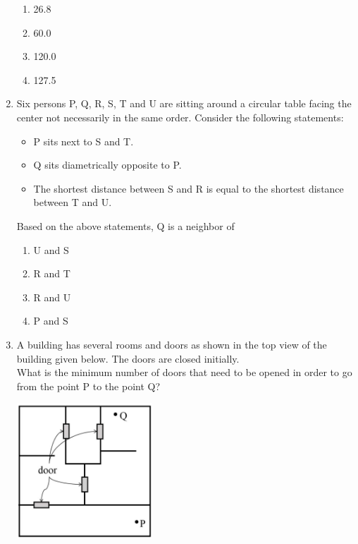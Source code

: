 \documentclass[journal,12pt,onecolumn]{exam}
\theoremstyle{remark}
\begin{document}
\begin{enumerate}
    \begin{enumerate}
        \item 26.8
        \item 60.0
        \item 120.0
        \item 127.5
    \end{enumerate}
    \item Six persons P, Q, R, S, T and U are sitting around a circular table facing the center not necessarily in the same order. Consider the following statements:
    \begin{itemize}
        \item P sits next to S and T.
        \item Q sits diametrically opposite to P.
        \item The shortest distance between S and R is equal to the shortest distance between T and U.
    \end{itemize}
    Based on the above statements, Q is a neighbor of

    \begin{enumerate}
        \item U and S
        \item R and T
        \item R and U
        \item P and S
    \end{enumerate}
    \item A building has several rooms and doors as shown in the top view of the building given below. The doors are closed initially.\\

    What is the minimum number of doors that need to be opened in order to go from the point P to the point Q?

    \begin{center}
        \includegraphics[width=0.4\textwidth]{figs/q 4.png} %
    \end{center}


\end{enumerate}
\end{document}
